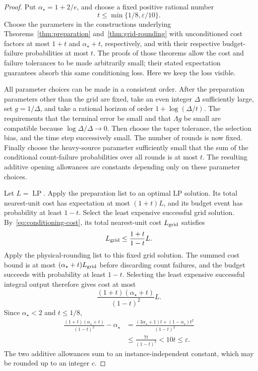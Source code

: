 \begin{proof}
Put \(\alpha_\star=1+2/e\), and choose a fixed positive rational
number
\[
 t\le\min\{1/8,\varepsilon/10\}.
\]
Choose the parameters in the constructions underlying
Theorems~\ref{thm:preparation} and~\ref{thm:grid-rounding} with
unconditioned cost factors at most \(1+t\) and
\(\alpha_\star+t\), respectively, and with their respective
budget-failure probabilities at most \(t\). The proofs of those
theorems allow the cost and failure tolerances to be made
arbitrarily small; their stated expectation guarantees absorb this
same conditioning loss. Here we keep the loss visible.

All parameter choices can be made in a consistent order. After the
preparation parameters other than the grid are fixed, take an even
integer \(\Delta\) sufficiently large, set \(g=1/\Delta\), and
take a rational horizon of order
\(1+\log(\Delta/t)\). The requirements that the terminal error
be small and that \(\Lambda g\) be small are compatible because
\(\log\Delta/\Delta\to0\). Then choose the taper tolerance,
the selection bias, and the time step successively small. The
number of rounds is now fixed. Finally choose the heavy-source
parameter sufficiently small that the sum of the conditional
count-failure probabilities over all rounds is at most \(t\).
The resulting additive opening allowances are constants depending
only on these parameter choices.

Let \(L=\operatorname{LP}\). Apply the preparation list to an
optimal LP solution. Its total nearest-unit cost has expectation at
most \((1+t)L\), and its budget event has probability at least
\(1-t\). Select the least expensive successful grid solution.
By~\eqref{eq:conditioning-cost}, its total nearest-unit cost
\(L_{\rm grid}\) satisfies
\[
 L_{\rm grid}\le\frac{1+t}{1-t}L.
\]
Apply the physical-rounding list to this fixed grid solution. The
summed cost bound is at most \((\alpha_\star+t)L_{\rm grid}\)
before discarding count failures, and the budget succeeds with
probability at least \(1-t\). Selecting the least expensive
successful integral output therefore gives cost at most
\[
 \frac{(1+t)(\alpha_\star+t)}{(1-t)^2}L.
\]
Since \(\alpha_\star<2\) and \(t\le1/8\),
\begin{align*}
 \frac{(1+t)(\alpha_\star+t)}{(1-t)^2}-\alpha_\star
 &=
 \frac{(3\alpha_\star+1)t+(1-\alpha_\star)t^2}
      {(1-t)^2}\\
 &\le\frac{7t}{(1-t)^2}
 <10t
 \le\varepsilon.
\end{align*}
The two additive allowances sum to an instance-independent
constant, which may be rounded up to an integer \(c\).


\end{proof}
